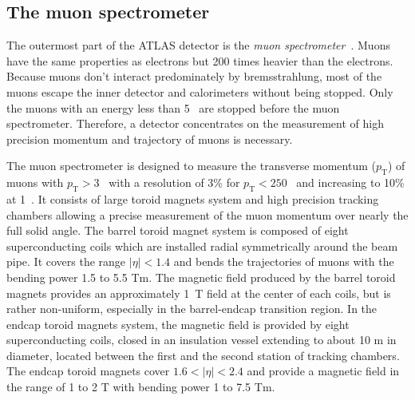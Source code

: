 
\subsection{The muon spectrometer}
\label{subsec:ae_the_muon_spectrometer}
The outermost part of the ATLAS detector is the \textit{muon spectrometer}~\cite{1748-0221-3-08-S08003,Palestini:681459,Diehl:2009bw}.
Muons have the same properties as electrons but 200 times heavier than the electrons.
Because muons don't interact predominately by bremsstrahlung, most of the muons escape the inner detector and calorimeters without being stopped.
Only the muons with an energy less than 5~{\GeV} are stopped before the muon spectrometer.
Therefore, a detector concentrates on the measurement of high precision momentum and trajectory of muons is necessary.

The muon spectrometer is designed to measure the transverse momentum ($p_{\mathrm{T}}$) of muons with $p_{\mathrm{T}} > 3$~{\GeV} with a resolution of 3\% for $p_{\mathrm{T}} < 250$~{\GeV} and increasing to 10\% at 1~{\TeV}.
It consists of large toroid magnets system and high precision tracking chambers allowing a precise measurement of the muon momentum over nearly the full solid angle.
The barrel toroid magnet system is composed of eight superconducting coils which are installed radial symmetrically around the beam pipe.
It covers the range $|\eta| < 1.4$ and bends the trajectories of muons with the bending power 1.5 to 5.5 Tm.
The magnetic field produced by the barrel toroid magnets provides an approximately 1~T field at the center of each coils, but is rather non-uniform, especially in the barrel-endcap transition region.
In the endcap toroid magnets system, the magnetic field is provided by eight superconducting coils, closed in an insulation vessel extending to about 10 m in diameter, located between the first and the second station of tracking chambers.
The endcap toroid magnets cover $1.6 < |\eta| < 2.4$ and provide a magnetic field in the range of 1 to 2 T with bending power 1 to 7.5 Tm.

